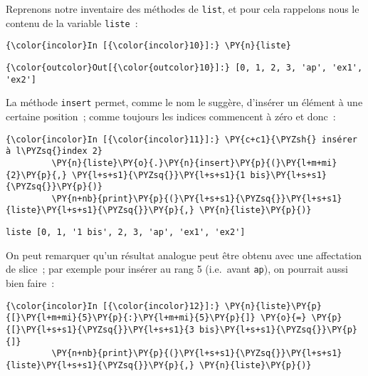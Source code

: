     Reprenons notre inventaire des méthodes de \texttt{list}, et pour cela
rappelons nous le contenu de la variable \texttt{liste}~:

    \begin{Verbatim}[commandchars=\\\{\}]
{\color{incolor}In [{\color{incolor}10}]:} \PY{n}{liste}
\end{Verbatim}


\begin{Verbatim}[commandchars=\\\{\}]
{\color{outcolor}Out[{\color{outcolor}10}]:} [0, 1, 2, 3, 'ap', 'ex1', 'ex2']
\end{Verbatim}
            
    La méthode \texttt{insert} permet, comme le nom le suggère, d'insérer un
élément à une certaine position~; comme toujours les indices commencent
à zéro et donc~:

    \begin{Verbatim}[commandchars=\\\{\}]
{\color{incolor}In [{\color{incolor}11}]:} \PY{c+c1}{\PYZsh{} insérer à l\PYZsq{}index 2}
         \PY{n}{liste}\PY{o}{.}\PY{n}{insert}\PY{p}{(}\PY{l+m+mi}{2}\PY{p}{,} \PY{l+s+s1}{\PYZsq{}}\PY{l+s+s1}{1 bis}\PY{l+s+s1}{\PYZsq{}}\PY{p}{)}
         \PY{n+nb}{print}\PY{p}{(}\PY{l+s+s1}{\PYZsq{}}\PY{l+s+s1}{liste}\PY{l+s+s1}{\PYZsq{}}\PY{p}{,} \PY{n}{liste}\PY{p}{)}
\end{Verbatim}


    \begin{Verbatim}[commandchars=\\\{\}]
liste [0, 1, '1 bis', 2, 3, 'ap', 'ex1', 'ex2']

    \end{Verbatim}

    On peut remarquer qu'un résultat analogue peut être obtenu avec une
affectation de slice~; par exemple pour insérer au rang 5 (i.e.~avant
\texttt{ap}), on pourrait aussi bien faire~:

    \begin{Verbatim}[commandchars=\\\{\}]
{\color{incolor}In [{\color{incolor}12}]:} \PY{n}{liste}\PY{p}{[}\PY{l+m+mi}{5}\PY{p}{:}\PY{l+m+mi}{5}\PY{p}{]} \PY{o}{=} \PY{p}{[}\PY{l+s+s1}{\PYZsq{}}\PY{l+s+s1}{3 bis}\PY{l+s+s1}{\PYZsq{}}\PY{p}{]}
         \PY{n+nb}{print}\PY{p}{(}\PY{l+s+s1}{\PYZsq{}}\PY{l+s+s1}{liste}\PY{l+s+s1}{\PYZsq{}}\PY{p}{,} \PY{n}{liste}\PY{p}{)}
\end{Verbatim}


